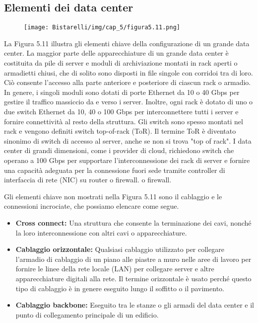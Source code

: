 \subsection{Elementi dei data center}

\begin{figure}[H]
	\centering
    \texttt{[image: Bistarelli/img/cap\_5/figura5.11.png]}
\end{figure}

La Figura 5.11 illustra gli elementi chiave della configurazione di un grande data center. La maggior parte delle apparecchiature di un grande data center è costituita da pile di server e moduli di archiviazione montati in rack aperti o armadietti chiusi, che di solito sono disposti in file singole con corridoi tra di loro. Ciò consente l'accesso alla parte anteriore e posteriore di ciascun rack o armadio. In genere, i singoli moduli sono dotati di porte Ethernet da 10 o 40 Gbps per gestire il traffico massiccio da e verso i server. Inoltre, ogni rack è dotato di uno o due switch Ethernet da 10, 40 o 100 Gbps per interconnettere tutti i server e fornire connettività al resto della struttura. Gli switch sono spesso montati nel rack e vengono definiti switch top-of-rack (ToR). Il termine ToR è diventato sinonimo di switch di accesso al server, anche se non si trova "top of rack". I data center di grandi dimensioni, come i provider di cloud, richiedono switch che operano a 100 Gbps per supportare l'interconnessione dei rack di server e fornire una capacità adeguata per la connessione fuori sede tramite controller di interfaccia di rete (NIC) su router o firewall. o firewall. 

\singlespacing

Gli elementi chiave non mostrati nella Figura 5.11 sono il cablaggio e le connessioni incrociate, che possiamo elencare come segue.

\begin{itemize}
    \item \textbf{Cross connect:} Una struttura che consente la terminazione dei cavi, nonché la loro interconnessione con altri cavi o apparecchiature.
    
    \item \textbf{Cablaggio orizzontale:} Qualsiasi cablaggio utilizzato per collegare l'armadio di cablaggio di un piano alle piastre a muro nelle aree di lavoro per fornire le linee della rete locale (LAN) per collegare server e altre apparecchiature digitali alla rete. Il termine orizzontale è usato perché questo tipo di cablaggio è in genere eseguito lungo il soffitto o il pavimento.
    
    \item \textbf{Cablaggio backbone:} Eseguito tra le stanze o gli armadi del data center e il punto di collegamento principale di un edificio.

\end{itemize}
